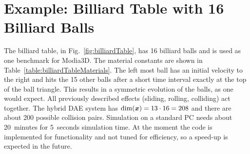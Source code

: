 \section{Example: Billiard Table with 16 Billiard Balls}\label{sec:Examples}

The billiard table, in Fig.~\ref{fig:billiardTable}, has 16 billiard balls and is used as one benchmark for Modia3D.
The material constants are shown in Table~\ref{table:billiardTableMaterials}.
The left most ball has an initial velocity to the right and hits the 15 other balls after a short time interval
exactly at the top of the ball triangle. This results in a symmetric evolution of the balls, as one would expect.
All previously described effects (sliding, rolling, colliding) act together. The hybrid DAE system has $\dim(\bvec{x}) = 13 \cdot 16 = 208$ and there are
about 200 possible collision pairs. Simulation on a standard PC needs about 20~minutes for 5~seconds simulation time. 
At the moment the code is implemented for functionality and not tuned for efficiency, so a speed-up is expected in the future.


